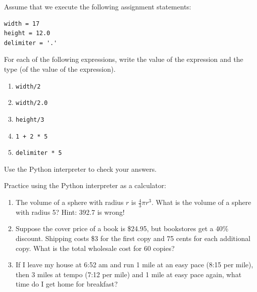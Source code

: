 \documentclass[10pt]{book}
\begin{document}
\begin{CJK}{UTF8}{gbsn}
\begin{exercise}

Assume that we execute the following assignment statements:

\begin{verbatim}
width = 17
height = 12.0
delimiter = '.'
\end{verbatim}

For each of the following expressions, write the value of the
expression and the type (of the value of the expression).

\begin{enumerate}

\item {\tt width/2}

\item {\tt width/2.0}

\item {\tt height/3}

\item {\tt 1 + 2 * 5}

\item {\tt delimiter * 5}

\end{enumerate}

Use the Python interpreter to check your answers.
\end{exercise}

\begin{exercise}

Practice using the Python interpreter as a calculator: 

\begin{enumerate}

\item The volume of a sphere with radius $r$ is $\frac{4}{3} \pi r^3$.
  What is the volume of a sphere with radius 5?  Hint: 392.7 is wrong!

\item Suppose the cover price of a book is \$24.95, but bookstores get a
  40\% discount.  Shipping costs \$3 for the first copy and 75 cents
  for each additional copy.  What is the total wholesale cost for
  60 copies?

\item If I leave my house at 6:52 am and run 1 mile at an easy pace
  (8:15 per mile), then 3 miles at tempo (7:12 per mile) and 1 mile at
  easy pace again, what time do I get home for breakfast?

\end{enumerate}
\end{exercise}



\end{CJK}
\end{document}
